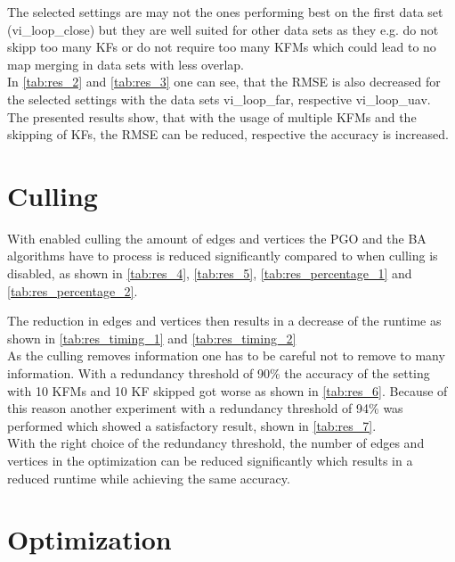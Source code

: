 The selected settings are may not the ones performing best on the first data set (vi\_loop\_close) but they are well suited for other data sets as they e.g. do not skipp too many \acp{KF} or do not require too many \acp{KFM} which could lead to no map merging in data sets with less overlap.\\

In \autoref{tab:res_2} and \autoref{tab:res_3} one can see, that the \ac{RMSE} is also decreased for the selected settings with the data sets vi\_loop\_far, respective vi\_loop\_uav.\\

The presented results show, that with the usage of multiple \acp{KFM} and the skipping of \acp{KF}, the \ac{RMSE} can be reduced, respective the accuracy is increased.

\section{Culling}

With enabled culling the amount of edges and vertices the \ac{PGO} and the \ac{BA} algorithms have to process is reduced significantly compared to when culling is disabled, as shown in \autoref{tab:res_4}, \autoref{tab:res_5}, \autoref{tab:res_percentage_1} and \autoref{tab:res_percentage_2}.

The reduction in edges and vertices then results in a decrease of the runtime as shown in \autoref{tab:res_timing_1} and \autoref{tab:res_timing_2}\\

As the culling removes information one has to be careful not to remove to many information. With a redundancy threshold of 90\% the accuracy of the setting with 10 \acp{KFM} and 10 \ac{KF} skipped got worse as shown in \autoref{tab:res_6}. Because of this reason another experiment with a redundancy threshold of 94\% was performed which showed a satisfactory result, shown in \autoref{tab:res_7}.\\

With the right choice of the redundancy threshold, the number of edges and vertices in the optimization can be reduced significantly which results in a reduced runtime while achieving the same accuracy. 


\section{Optimization}
